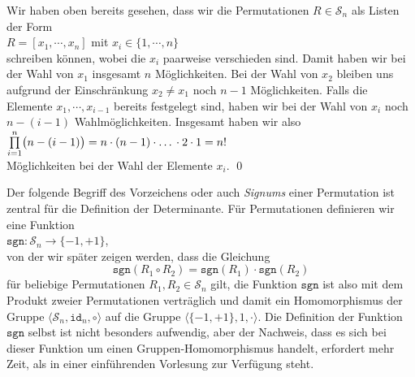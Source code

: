 \proof
Wir haben oben bereits gesehen, dass wir die Permutationen $R \in \mathcal{S}_n$ als Listen der Form
\\[0.2cm]
\hspace*{1.3cm}
$R = [x_1, \cdots, x_n]$ \quad mit $x_i \in \{1,\cdots,n\}$
\\[0.2cm]
schreiben k\"onnen, wobei die $x_i$ paarweise verschieden sind.  Damit haben wir bei der Wahl von
$x_1$ insgesamt $n$ M\"oglichkeiten.  Bei der Wahl von $x_2$ bleiben uns aufgrund der Einschr\"ankung
$x_2 \not= x_1$ noch $n-1$ M\"oglichkeiten.  Falls die Elemente $x_1, \cdots, x_{i-1}$ bereits
festgelegt sind, haben wir bei der Wahl von $x_i$ noch $n - (i - 1)$ Wahlm\"oglichkeiten.   Insgesamt
haben wir also
\\[0.2cm]
\hspace*{1.3cm}
$\prod\limits_{i=1}^n \bigl(n - (i-1)\bigr) = n \cdot (n-1) \cdot \mbox{\dots} \cdot 2 \cdot 1 = n!$
\\[0.2cm]
M\"oglichkeiten bei der Wahl der Elemente $x_i$. \qed 

Der folgende Begriff des Vorzeichens oder auch \emph{Signums} einer Permutation ist zentral f\"ur die
Definition der Determinante.  F\"ur Permutationen definieren wir eine Funktion
\\[0.2cm]
\hspace*{1.3cm}
$\mathtt{sgn}: \mathcal{S}_n \rightarrow \{-1, +1 \}$,
\\[0.2cm]
von der wir sp\"ater zeigen werden, dass die Gleichung
\begin{equation}
  \label{eq:sgn-homomorph}
  \mathtt{sgn}(R_1 \circ R_2) = \mathtt{sgn}(R_1) \cdot \mathtt{sgn}(R_2) 
\end{equation}
f\"ur beliebige Permutationen $R_1,R_2 \in \mathcal{S}_n$ gilt,  die Funktion $\mathtt{sgn}$ ist also
mit dem Produkt zweier Permutationen vertr\"aglich und damit ein Homomorphismus der Gruppe
$\langle \mathcal{S}_n, \mathtt{id}_n, \circ \rangle$ auf die Gruppe $\langle \{-1,+1\}, 1, \cdot \rangle$.  Die Definition der Funktion $\mathtt{sgn}$ selbst
ist nicht besonders aufwendig,  aber der Nachweis, dass es sich bei dieser Funktion um einen
Gruppen-Homomorphismus handelt, erfordert  mehr Zeit, als in einer einf\"uhrenden Vorlesung zur
Verf\"ugung steht.

